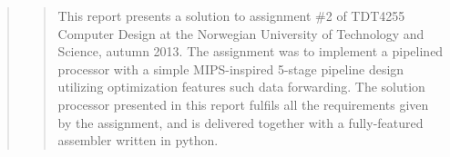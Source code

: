 \begin{quote}
\begin{quote}
This report presents a solution to assignment \#2 of TDT4255 Computer Design at the Norwegian University of Technology and Science, autumn 2013.
The assignment was to implement a pipelined processor with a simple MIPS-inspired 5-stage pipeline design utilizing optimization features such data forwarding.
The solution processor presented in this report fulfils all the requirements given by the assignment, and is delivered together with a fully-featured assembler written in python.
\end{quote}
\end{quote}
